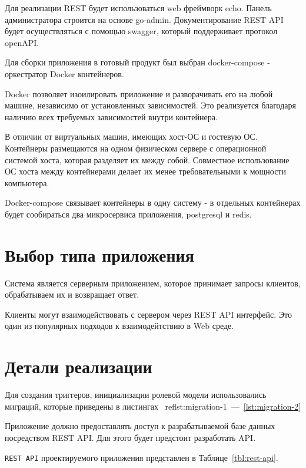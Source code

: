 Для реализации REST будет использоваться web фреймворк echo\cite{web-echo}. Панель администратора строится на основе go-admin\cite{go-admin}. Документирование REST API будет осуществляться с помощью swagger\cite{swagger}, который поддерживает протокол openAPI\cite{openapi}. 

Для сборки приложения в готовый продукт был выбран docker-compose\cite{docker-compose} - оркестратор Docker контейнеров\cite{docker}. 

Docker позволяет изоилировать приложение и разворачивать его на любой машине, независимо от установленных зависимостей. Это реализуется благодаря наличию всех требуемых зависимостей внутри контейнера. 

В отличии от виртуальных машин, имеющих хост-ОС и гостевую ОС. Контейнеры  размещаются на одном физическом сервере с операционной системой хоста, которая разделяет их между собой. Совместное использование ОС хоста между контейнерами делает их менее требовательными к мощности компьютера.

Docker-compose связывает контейнеры в одну систему - в отдельных контейнерах будет сообираться два микросервиса приложения, postgresql и redis. 
 
\section{Выбор типа приложения}

Система является серверным приложением, которое принимает запросы клиентов, обрабатываем их и возвращает ответ.

Клиенты могут взаимодействовать с сервером через REST API интерфейс. Это один из популярных подходов к взаимодейтствию в Web среде. 

\section{Детали реализации}
Для создания триггеров, инициализации ролевой модели использовались миграций, которые приведены в листингах ~ref{lst:migration-1}~---~\ref{lst:migration-2}

Приложение должно предоставлять доступ к разрабатываемой базе данных посредством REST API. Для этого будет предстоит разработать API.

\texttt{REST API} проектируемого приложения представлен в Таблице~\ref{tbl:rest-api}.

